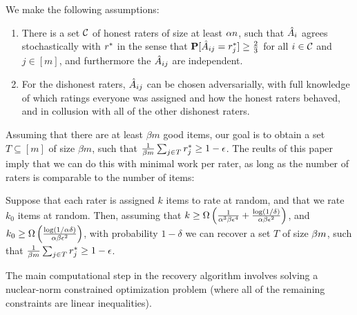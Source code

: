 We make the following assumptions:
\begin{enumerate}
\item There is a set $\mathcal{C}$ of honest raters of size at least $\alpha n$, 
      such that $\hat{A}_i$ agrees stochastically with $r^*$ in the sense that 
      $\mathbf{P}[\hat{A}_{ij} = r^*_j] \geq \frac{2}{3}$ for all $i \in \mathcal{C}$ and 
      $j \in [m]$, and furthermore the $\hat{A}_{ij}$ are independent.
\item For the dishonest raters, $\hat{A}_{ij}$ can be chosen adversarially, 
      with full knowledge of which ratings everyone was assigned and how the 
      honest raters behaved, and in collusion with all of the other 
      dishonest raters.
\end{enumerate}
Assuming that there are at least $\beta m$ good items, our goal is to obtain 
a set $T \subseteq [m]$ of size $\beta m$, such that 
$\frac{1}{\beta m} \sum_{j \in T} r^*_j \geq 1-\epsilon$.
The reults of this paper imply that we can do this with minimal work per rater, 
as long as the number of raters is comparable to the number of items:
\begin{theorem}
\label{thm:main-1}
Suppose that each rater is assigned $k$ items to rate at random, and that we rate 
$k_0$ items at random. Then, assuming that $k \geq \Omega\left( \frac{1}{\alpha^3\beta\epsilon^4} + \frac{\log(1/\delta)}{\alpha\beta\epsilon^2} \right)$, and 
$k_0 \geq \Omega\left( \frac{\log(1/\alpha\delta)}{\alpha\beta\epsilon^2} \right)$, 
with probability $1-\delta$ we can recover a set $T$ of size $\beta m$, 
such that $\frac{1}{\beta m} \sum_{j \in T} r^*_j \geq 1-\epsilon$.
\end{theorem}
The main computational step in the recovery algorithm involves solving a 
nuclear-norm constrained optimization problem (where all of the remaining 
constraints are linear inequalities). 



